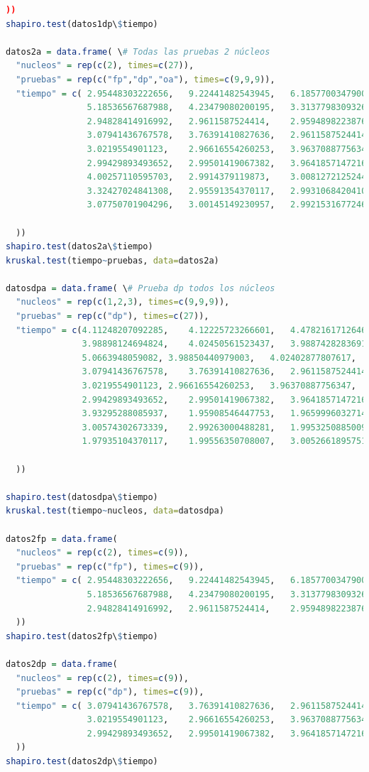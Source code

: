 \documentclass{article}
\begin{document}
\begin{lstlisting}[language=R]
  ))
shapiro.test(datos1dp\$tiempo)

datos2a = data.frame( \# Todas las pruebas 2 núcleos
  "nucleos" = rep(c(2), times=c(27)),
  "pruebas" = rep(c("fp","dp","oa"), times=c(9,9,9)),
  "tiempo" = c( 2.95448303222656,	9.22441482543945,	6.18577003479003,
                5.18536567687988,	4.23479080200195,	3.31377983093261,
                2.94828414916992,	2.9611587524414,	2.95948982238769,
                3.07941436767578,	3.76391410827636,	2.9611587524414,
                3.0219554901123,	2.96616554260253,	3.96370887756347,
                2.99429893493652,	2.99501419067382,	3.96418571472167,
                4.00257110595703,	2.9914379119873,	3.00812721252441,
                3.32427024841308,	2.95591354370117,	2.99310684204101,	
                3.07750701904296,	3.00145149230957,	2.9921531677246

  ))
shapiro.test(datos2a\$tiempo)
kruskal.test(tiempo~pruebas, data=datos2a)

datosdpa = data.frame( \# Prueba dp todos los núcleos
  "nucleos" = rep(c(1,2,3), times=c(9,9,9)),
  "pruebas" = rep(c("dp"), times=c(27)),
  "tiempo" = c(4.11248207092285,	4.12225723266601,	4.47821617126464,	
               3.98898124694824,	4.02450561523437,	3.98874282836914,	
               5.0663948059082,	3.98850440979003,	4.02402877807617, 
               3.07941436767578,	3.76391410827636,	2.9611587524414,	
               3.0219554901123,	2.96616554260253,	3.96370887756347,	
               2.99429893493652,	2.99501419067382,	3.96418571472167, 
               3.93295288085937,	1.95908546447753,	1.96599960327148,	
               3.00574302673339,	2.99263000488281,	1.99532508850097,	
               1.97935104370117,	1.99556350708007,	3.00526618957519
               
  ))

shapiro.test(datosdpa\$tiempo)
kruskal.test(tiempo~nucleos, data=datosdpa)

datos2fp = data.frame(
  "nucleos" = rep(c(2), times=c(9)),
  "pruebas" = rep(c("fp"), times=c(9)),
  "tiempo" = c(	2.95448303222656,	9.22441482543945,	6.18577003479003,	
                5.18536567687988,	4.23479080200195,	3.31377983093261,
                2.94828414916992,	2.9611587524414,	2.95948982238769
  ))
shapiro.test(datos2fp\$tiempo)

datos2dp = data.frame(
  "nucleos" = rep(c(2), times=c(9)),
  "pruebas" = rep(c("dp"), times=c(9)),
  "tiempo" = c(	3.07941436767578,	3.76391410827636,	2.9611587524414,
                3.0219554901123,	2.96616554260253,	3.96370887756347,	
                2.99429893493652,	2.99501419067382,	3.96418571472167
  ))
shapiro.test(datos2dp\$tiempo)


\end{lstlisting}
\end{document}
